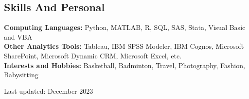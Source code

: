 \documentclass[margin,line]{resume}
\begin{document}
\begin{resume}
    \section{\mysidestyle Skills And Personal}
    \textbf{Computing Languages:} Python, MATLAB, R, SQL, SAS, Stata, Visual Basic and VBA\\
    \textbf{Other Analytics Tools:} Tableau, IBM SPSS Modeler, IBM Cognos, Microsoft SharePoint, Microsoft Dynamic CRM, Microsoft Excel, etc.\\
    \textbf{Interests and Hobbies:} Basketball, Badminton, Travel, Photography, Fashion, Babysitting


%
%

\hfill 
\scriptsize Last updated: December 2023
\end{resume}   
\end{document}
